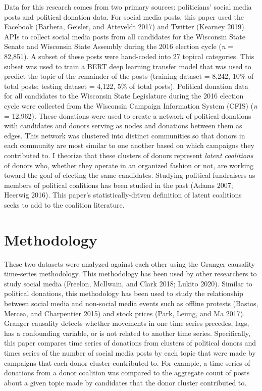 \documentclass[12pt,]{article}
\begin{document}
Data for this research comes from two primary sources: politicians'
social media posts and political donation data. For social media posts,
this paper used the Facebook (Barbera, Geisler, and Atteveldt 2017) and
Twitter (Kearney 2019) APIs to collect social media posts from all
candidates for the Wisconsin State Senate and Wisconsin State Assembly
during the 2016 election cycle (\emph{n} = 82,851). A subset of these
posts were hand-coded into 27 topical categories. This subset was used
to train a BERT deep learning transfer model that was used to predict
the topic of the remainder of the posts (training dataset = 8,242, 10\%
of total posts; testing dataset = 4,122, 5\% of total posts). Political
donation data for all candidates to the Wisconsin State Legislature
during the 2016 election cycle were collected from the Wisconsin
Campaign Information System (CFIS) (\emph{n} = 12,962). These donations
were used to create a network of political donations with candidates and
donors serving as nodes and donations between them as edges. This
network was clustered into distinct communities so that donors in each
community are most similar to one another based on which campaigns they
contributed to. I theorize that these clusters of donors represent
\emph{latent coalitions} of donors who, whether they operate in an
organized fashion or not, are working toward the goal of electing the
same candidates. Studying political fundraisers as members of political
coalitions has been studied in the past (Adams 2007; Heerwig 2016). This
paper's statistically-driven definition of latent coalitions seeks to
add to the coalition literature.

\hypertarget{methodology}{%
\section{Methodology}\label{methodology}}

These two datasets were analyzed against each other using the Granger
causality time-series methodology. This methodology has been used by
other researchers to study social media (Freelon, McIlwain, and Clark
2018; Lukito 2020). Similar to political donations, this methodology has
been used to study the relationship between social media and non-social
media events such as offline protests (Bastos, Mercea, and Charpentier
2015) and stock prices (Park, Leung, and Ma 2017). Granger causality
detects whether movements in one time series precedes, lags, has a
confounding variable, or is not related to another time series.
Specifically, this paper compares time series of donations from clusters
of political donors and times series of the number of social media posts
by each topic that were made by campaigns that each donor cluster
contributed to. For example, a time series of donations from a donor
coalition was compared to the aggregate count of posts about a given
topic made by candidates that the donor cluster contributed to.
\end{document}

